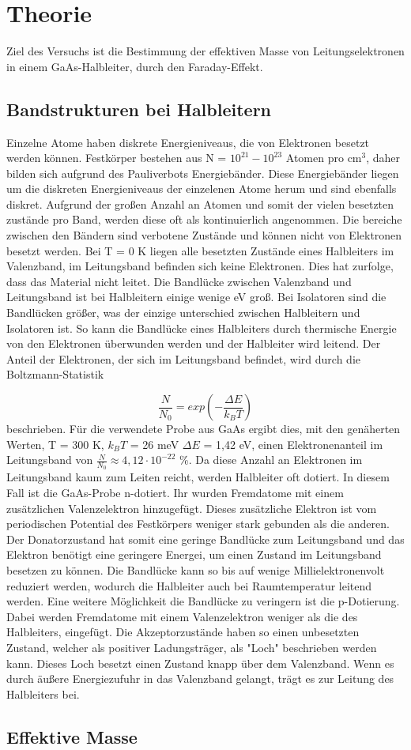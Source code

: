 \section{Theorie}
\label{sec:Theorie}
Ziel des Versuchs ist die Bestimmung der effektiven Masse von Leitungselektronen in einem GaAs-Halbleiter, 
durch den Faraday-Effekt.

\subsection{Bandstrukturen bei Halbleitern}
Einzelne Atome haben diskrete Energieniveaus, die von Elektronen besetzt werden können. 
Festkörper bestehen aus N = $10^21 - 10^23$ Atomen pro cm$^3$, daher bilden sich aufgrund des Pauliverbots Energiebänder.
Diese Energiebänder liegen um die diskreten Energieniveaus der einzelenen Atome herum und sind ebenfalls diskret. 
Aufgrund der großen Anzahl an Atomen und somit der vielen besetzten zustände pro Band, werden diese oft als kontinuierlich angenommen. 
Die bereiche zwischen den Bändern sind verbotene Zustände und können nicht von Elektronen besetzt werden. 
Bei T = 0 K liegen alle besetzten Zustände eines Halbleiters im Valenzband, im Leitungsband befinden sich keine Elektronen.
Dies hat zurfolge, dass das Material nicht leitet.
Die Bandlücke zwischen Valenzband und Leitungsband ist bei Halbleitern einige wenige eV groß. 
Bei Isolatoren sind die Bandlücken größer, was der einzige unterschied zwischen Halbleitern und Isolatoren ist.
So kann die Bandlücke eines Halbleiters durch thermische Energie von den Elektronen überwunden werden und der 
Halbleiter wird leitend. Der Anteil der Elektronen, der sich im Leitungsband befindet, wird durch die Boltzmann-Statistik

\begin{equation}
    \frac{N}{N_0} = exp \left(-\frac{\Delta E}{k_B T}\right)
\end{equation} 
beschrieben.
Für die verwendete Probe aus GaAs ergibt dies, mit den genäherten Werten, T = 300 K, $k_B T$ = 26 meV $\Delta E$ = 1,42 eV, 
einen Elektronenanteil im Leitungsband von $\frac{N}{N_0} \approx 4,12 \cdot 10^{-22}$ \%.
Da diese Anzahl an Elektronen im Leitungsband kaum zum Leiten reicht, werden Halbleiter oft dotiert. 
In diesem Fall ist die GaAs-Probe n-dotiert. Ihr wurden Fremdatome mit einem zusätzlichen Valenzelektron hinzugefügt.
Dieses zusätzliche Elektron ist vom periodischen Potential des Festkörpers weniger stark gebunden als die anderen. 
Der Donatorzustand hat somit eine geringe Bandlücke zum Leitungsband 
und das Elektron benötigt eine geringere Energei, um einen Zustand im Leitungsband besetzen zu können.
Die Bandlücke kann so bis auf wenige Millielektronenvolt reduziert werden, wodurch die Halbleiter auch bei 
Raumtemperatur leitend werden.
Eine weitere Möglichkeit die Bandlücke zu veringern ist die p-Dotierung. 
Dabei werden Fremdatome mit einem Valenzelektron weniger als die des Halbleiters, eingefügt. 
Die Akzeptorzustände haben so einen unbesetzten Zustand, welcher als positiver Ladungsträger, als "Loch" beschrieben werden kann. 
Dieses Loch besetzt einen Zustand knapp über dem Valenzband. Wenn es durch äußere Energiezufuhr 
in das Valenzband gelangt, trägt es zur Leitung des Halbleiters bei.

\subsection{Effektive Masse}



